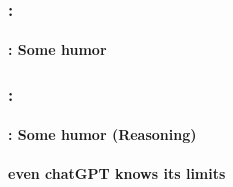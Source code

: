 \documentclass[xcolor=table]{beamer}
\begin{document}
\begin{frame}
	\frametitle{\insertshortsubtitle: \insertsection}
	\framesubtitle{\insertsubsection: Some humor}
	
	\begin{center}
	\end{center}
	
\end{frame}

\begin{frame}
	\frametitle{\insertshortsubtitle: \insertsection}
	\framesubtitle{\insertsubsection: Some humor (Reasoning)}
	
	\begin{center}\bfseries\large
		even chatGPT knows its limits
		
	\end{center}
	
\end{frame}


\end{document}
